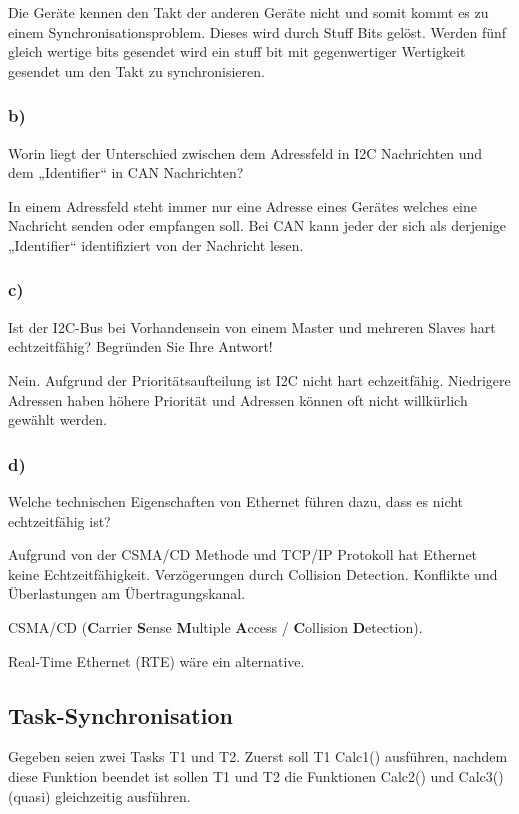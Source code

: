 Die Geräte kennen den Takt der anderen Geräte nicht und somit kommt es zu einem Synchronisationsproblem. Dieses wird durch 
Stuff Bits gelöst. Werden fünf gleich wertige bits gesendet wird ein stuff bit mit gegenwertiger Wertigkeit gesendet um den Takt 
zu synchronisieren.

\subsubsection{b)}
Worin liegt der Unterschied zwischen dem Adressfeld in I2C Nachrichten und dem „Identifier“ in
CAN Nachrichten?

In einem Adressfeld steht immer nur eine Adresse eines Gerätes welches eine Nachricht senden oder empfangen soll.
Bei CAN kann jeder der sich als derjenige „Identifier“ identifiziert von der Nachricht lesen.

\subsubsection{c)}
Ist der I2C-Bus bei Vorhandensein von einem Master und mehreren Slaves hart echtzeitfähig? Begründen Sie Ihre Antwort!

Nein. Aufgrund der Prioritätsaufteilung ist I2C nicht hart echzeitfähig. Niedrigere Adressen haben höhere Priorität und 
Adressen können oft nicht willkürlich gewählt werden.

\subsubsection{d)}
Welche technischen Eigenschaften von Ethernet führen dazu, dass es nicht echtzeitfähig ist?

Aufgrund von der CSMA/CD Methode und TCP/IP Protokoll hat Ethernet keine Echtzeitfähigkeit.
Verzögerungen durch Collision Detection. Konflikte und Überlastungen am Übertragungskanal. 

CSMA/CD (\textbf{C}arrier \textbf{S}ense \textbf{M}ultiple \textbf{A}ccess / \textbf{C}ollision \textbf{D}etection).

Real-Time Ethernet (RTE) wäre ein alternative.

\subsection{Task-Synchronisation}
Gegeben seien zwei Tasks T1 und T2. Zuerst soll T1 Calc1() ausführen, nachdem diese Funktion beendet ist
sollen T1 und T2 die Funktionen Calc2() und Calc3() (quasi) gleichzeitig ausführen.

